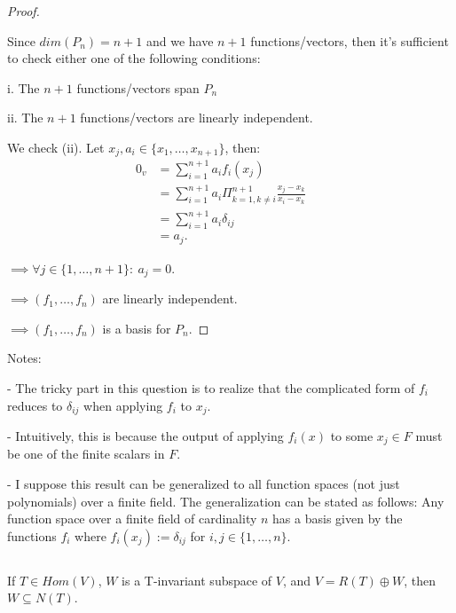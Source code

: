 \documentclass{article}
\newenvironment{customthm}[1]
  {\renewcommand\theinnercustomthm{#1}\innercustomthm}
  {\endinnercustomthm}
\begin{document}
\begin{proof}
  $ $

  Since $dim(P_n) = n+1$ and we have $n+1$ functions/vectors, then it's sufficient to check either one of the following conditions: 
  
  \qquad i. The $n+1$ functions/vectors span $P_n$

  \qquad ii. The $n+1$ functions/vectors are linearly independent.
  \newline

  We check (ii). Let $x_j, a_i \in \{x_1,\ldots,x_{n+1}\}$, then:
  \begin{align*}
    0_v &= \sum_{i=1}^{n+1} a_i f_i(x_j) &&\\
    &= \sum_{i=1}^{n+1} a_i \Pi_{k=1, k \neq i}^{n+1}\frac{x_j - x_k}{x_i - x_k} &&\\
    &= \sum_{i=1}^{n+1} a_i \delta_{ij} &&\\
    &= a_j.
  \end{align*}

  \noindent
  $\implies \forall j \in \{1,\ldots,n+1\}: \  a_j = 0$.

  \noindent
  $\implies (f_1,\ldots,f_n)$ are linearly independent.

  \noindent
  $\implies (f_1,\ldots,f_n)$ is a basis for $P_n$.

\end{proof}

\noindent
Notes:

\quad - The tricky part in this question is to realize that the complicated form of $f_i$ reduces to $\delta_{ij}$ when applying $f_i$ to $x_j$.

\quad - Intuitively, this is because the output of applying $f_i(x)$ to some $x_j \in F$ must be one of the finite scalars in $F$.

\quad - I suppose this result can be generalized to all function spaces (not just polynomials) over a finite field. The generalization can be stated as follows: Any function space over a finite field of cardinality $n$ has a basis given by the functions $f_i$ where $f_i(x_j) := \delta_{ij}$ for $i,j \in \{1,\ldots,n\}$.
\newpage

\begin{customthm}{3}[2023.S(1.A.iii)]
  $ $

  If $T \in Hom(V)$, $W$ is a T-invariant subspace of $V$, and $V = R(T) \oplus W$, then $W \subseteq N(T)$. 

\end{customthm}
\end{document}
